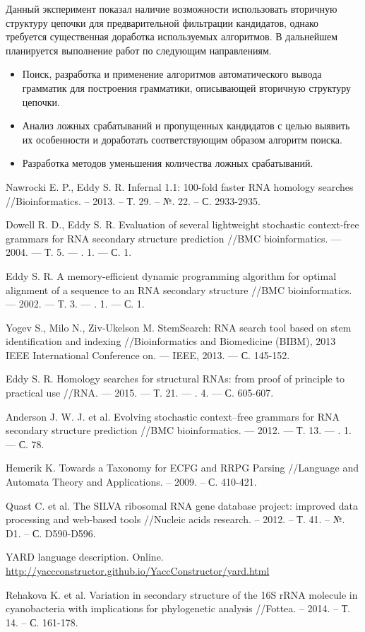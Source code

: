 \documentclass[12pt]{article}  %
\theoremstyle{remark}
\begin{document}
Данный эксперимент показал наличие возможности использовать вторичную структуру цепочки для предварительной фильтрации кандидатов, однако требуется существенная доработка используемых алгоритмов.
В дальнейшем планируется выполнение работ по следующим направлениям.
\begin{itemize}
\item Поиск, разработка и применение алгоритмов автоматического вывода грамматик для построения грамматики, описывающей вторичную структуру цепочки.
\item Анализ ложных срабатываний и пропущенных кандидатов с целью выявить их особенности и доработать соответствующим образом алгоритм поиска.
\item Разработка методов уменьшения количества ложных срабатываний.
\end{itemize}


\begin{thebibliography}{9}

   Nawrocki E. P., Eddy S. R. Infernal 1.1: 100-fold faster RNA homology searches //Bioinformatics. – 2013. – Т. 29. – №. 22. – С. 2933-2935.

Dowell R. D., Eddy S. R. Evaluation of several lightweight stochastic context-free grammars for RNA 
secondary structure prediction //BMC bioinformatics. --- 2004. --- Т. 5. --- \textnumero. 1. --- С. 1.

Eddy S. R. A memory-efficient dynamic programming algorithm for optimal alignment of a sequence to 
an RNA secondary structure //BMC bioinformatics. --- 2002. --- Т. 3. --- \textnumero. 1. --- С. 1.

Yogev S., Milo N., Ziv-Ukelson M. StemSearch: RNA search tool based on stem identification and indexing //Bioinformatics and Biomedicine (BIBM), 2013 IEEE International Conference on. --- IEEE, 2013. --- С. 145-152.

Eddy S. R. Homology searches for structural RNAs: from proof of principle to practical use //RNA. --- 2015. --- Т. 21. --- \textnumero. 4. --- С. 605-607.

Anderson J. W. J. et al. Evolving stochastic context--free grammars for RNA secondary structure prediction //BMC bioinformatics. --- 2012. --- Т. 13. --- \textnumero. 1. --- С. 78.

Hemerik K. Towards a Taxonomy for ECFG and RRPG Parsing //Language and Automata Theory and Applications. – 2009. – С. 410-421.

Quast C. et al. The SILVA ribosomal RNA gene database project: improved data processing and web-based tools //Nucleic acids research. – 2012. – Т. 41. – №. D1. – С. D590-D596.

YARD language description. Online. \url{http://yaccconstructor.github.io/YaccConstructor/yard.html}

Rehakova K. et al. Variation in secondary structure of the 16S rRNA molecule in cyanobacteria with implications for phylogenetic analysis //Fottea. – 2014. – Т. 14. – С. 161-178.

\end{thebibliography}
\end{document}
